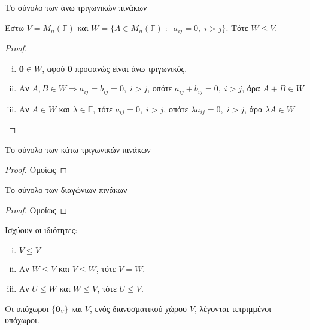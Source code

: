 \documentclass[a4paper,table]{report}
\begin{document}
\begin{example}
  \textcolor{Col2}{Το σύνολο των άνω τριγωνικών πινάκων}

  Έστω $ V = M_{n}(\mathbb{F}) $ και $ W = \{ A \in M_{n}(\mathbb{F}) \;
  : \; \; a_{ij} = 0, \; i>j \}  $. Τότε $ W \leq V $.

  \begin{proof}
  \item {}
    \begin{enumerate}[i)]
      \item  $ \mathbf{0} \in W $, αφού $ \mathbf{0} $ 
        προφανώς είναι άνω τριγωνικός.
      \item  Αν $ A, B \in W \Rightarrow a_{ij} = b_{ij} = 0, 
        \; i>j$, οπότε $a_{ij} + b_{ij} = 0, \; i>j$, άρα $A+B \in W$
      \item Αν $ A \in W $ και $ \lambda \in \mathbb{F} $, τότε 
        $a_{ij} = 0, \; i>j$, οπότε $ \lambda a_{ij} = 0, \; i>j$, 
        άρα $ \lambda A \in W $
    \end{enumerate}
  \end{proof}
\end{example}

\begin{example}
  \textcolor{Col2}{Το σύνολο των κάτω τριγωνικών πινάκων}
  \begin{proof}
    Ομοίως
  \end{proof}
\end{example}

\begin{example}
  \textcolor{Col2}{Το σύνολο των διαγώνιων πινάκων}

  \begin{proof}
    Ομοίως
  \end{proof}
\end{example}

\begin{prop}
  Ισχύουν οι ιδιότητες:
  \begin{enumerate}[i)]
    \item $ V \leq V $
    \item Αν $ W \leq V $ και $ V \leq W $, τότε $ V = W $.
    \item Αν $ U \leq W $ και $ W \leq V $, τότε $ U \leq V $.
  \end{enumerate}
\end{prop}

\begin{rem}
  Οι υπόχωροι $ \{ \mathbf{0}_{V} \} $ και $V$, ενός διανυσματικού χώρου $V$, 
  λέγονται \textcolor{Col2}{τετριμμένοι υπόχωροι}.
\end{rem}
\end{document}
